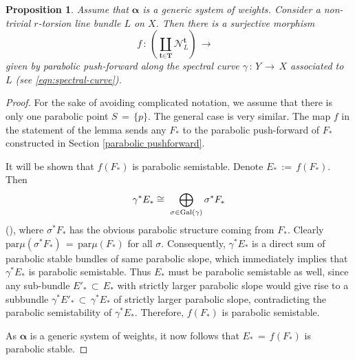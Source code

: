 \documentclass[10pt,reqno]{amsart}
\DeclareMathOperator{\MLalpha}{\left(\mc{M}^{\boldsymbol{m,\alpha}}_X(r,\ \xi)\right)^L}
\newcommand{\mc}[1]{\mathcal{#1}}
\newtheorem{proposition}[theorem]{Proposition}
\theoremstyle{myroman}
\numberwithin{equation}{section}
\begin{document}
		\begin{proposition}\label{prop:parabolic-fixed-point}
			Assume that $\boldsymbol{\alpha}$ is a generic system of weights. Consider a non-trivial $r$-torsion line bundle $L$ on $X$.
			Then there is a surjective morphism 
			\begin{equation*}
				f\,:\,\left(\coprod_{\textbf{t}\in \textbf{T}}\mathcal{N}^{\textbf{t}}_L\right)\,\longrightarrow\, \MLalpha
			\end{equation*} given by
			parabolic push-forward along the spectral curve $\gamma \,:\, Y\,\longrightarrow\, X$ associated to
			$L$ (see \eqref{eqn:spectral-curve}).
		\end{proposition}
		
		\begin{proof}
			For the sake of avoiding complicated notation, we assume that there is only one parabolic point
			$S\,=\,\{p\}$. The general case is very similar. The 
			map $f$ in the statement of the lemma sends any $F_*$
			to the parabolic push-forward of $F_*$ constructed in Section \ref{parabolic pushforward}.
			
			It will be shown that $f(F_*)$ is parabolic semistable. Denote $E_*\,:= \,f(F_*)$. Then 
			$$\gamma^* E_* \cong\ \bigoplus_{\sigma\in 
				\textnormal{Gal}(\gamma)} \sigma^* F_*
			$$ 
			(\cite[p.~68]{Ses}), where $\sigma^* F_*$ has the obvious parabolic 
			structure coming from $F_*$. Clearly $\text{par}\mu(\sigma^*F_*)\,=\,\text{par}\mu(F_*)$ for all $\sigma$.
			Consequently, $\gamma^* E_*$ is a direct sum of parabolic stable bundles of same parabolic slope, which 
			immediately implies that $\gamma^* E_*$ is parabolic semistable. Thus $E_*$ must be parabolic 
			semistable as well, since any sub-bundle $E'_*\,\subset\, E_*$ with strictly larger parabolic 
			slope would give rise to a subbundle $\gamma^* E'_*\,\subset \,\gamma^* E_*$ of strictly 
			larger parabolic slope, contradicting the parabolic semistability of $\gamma^* E_*$.
			Therefore, $f(F_*)$ is parabolic semistable.
			
			As $\boldsymbol{\alpha}$ is a generic system of weights, it now
			follows that $E_* \,=\, f(F_*)$ is parabolic stable.
			

\end{proof}
\end{document}
